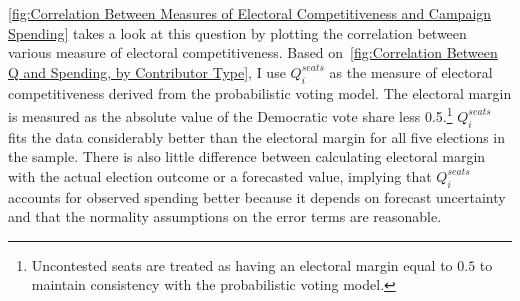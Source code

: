 \documentclass[12pt,final,fleqn]{article}
\theoremstyle{plain}
\begin{document}
\autoref{fig:Correlation Between Measures of Electoral Competitiveness and Campaign Spending} takes a look at this question by plotting the correlation between various measure of electoral competitiveness. Based on~\autoref{fig:Correlation Between Q and Spending, by Contributor Type}, I use $Q_i^{seats}$ as the measure of electoral competitiveness derived from the probabilistic voting model. The electoral margin is measured as the absolute value of the Democratic vote share less 0.5.\footnote{Uncontested seats are treated as having an electoral margin equal to $0.5$ to maintain consistency with the probabilistic voting model.} $Q_i^{seats}$ fits the data considerably better than the electoral margin for all five elections in the sample. There is also little difference between calculating electoral margin with the actual election outcome or a forecasted value, implying that $Q_i^{seats}$ accounts for observed spending better because it depends on forecast uncertainty and that the normality assumptions on the error terms are reasonable. 
\end{document}
